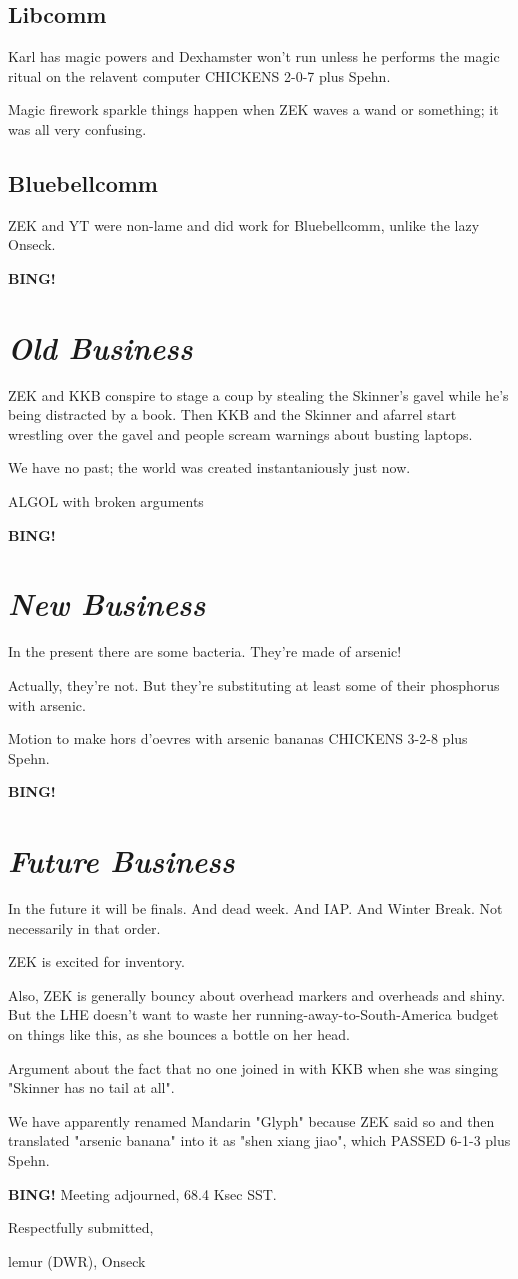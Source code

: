 \documentclass[10pt]{article}
\newcommand{\bing}{{\bf BING!} }
\newcommand{\goto}[1]{\bing \vskip 12pt \section*{{\em{#1}}}}
\newcommand{\ps}{ plus Spehn\xspace}
\newcommand{\onseck}{lemur (DWR), Onseck}
\begin{document}
\subsection*{Libcomm}

Karl has magic powers and Dexhamster won't run unless he performs the magic
ritual on the relavent computer CHICKENS 2-0-7\ps.

Magic firework sparkle things happen when ZEK waves a wand or something; 
it was all very confusing.

\subsection*{Bluebellcomm}

ZEK and YT were non-lame and did work for Bluebellcomm, unlike the lazy
Onseck.

\goto{Old Business}

ZEK and KKB conspire to stage a coup by stealing the Skinner's gavel while
he's being distracted by a book.  Then KKB and the Skinner and afarrel start
wrestling over the gavel and people scream warnings about busting laptops.

We have no past; the world was created instantaniously just now.

ALGOL with broken arguments

\goto{New Business}

In the present there are some bacteria.  They're made of arsenic!

Actually, they're not.  But they're substituting at least some of their
phosphorus with arsenic.

Motion to make hors d'oevres with arsenic bananas CHICKENS 3-2-8\ps.

\goto{Future Business}

In the future it will be finals.  And dead week.  And IAP.  And Winter Break.
Not necessarily in that order.

ZEK is excited for inventory.

Also, ZEK is generally bouncy about overhead markers and overheads and
shiny.  But the LHE doesn't want to waste her running-away-to-South-America
budget on things like this, as she bounces a bottle on her head.

Argument about the fact that no one joined in with KKB when she was singing
"Skinner has no tail at all".

We have apparently renamed Mandarin "Glyph" because ZEK said so and then
translated "arsenic banana" into it as "shen xiang jiao",
which PASSED 6-1-3\ps.

\bing
\noindent
Meeting adjourned, 68.4 Ksec SST.

\vspace{18pt}

\centerline{Respectfully submitted,}
\centerline{\onseck}
\end{document}
